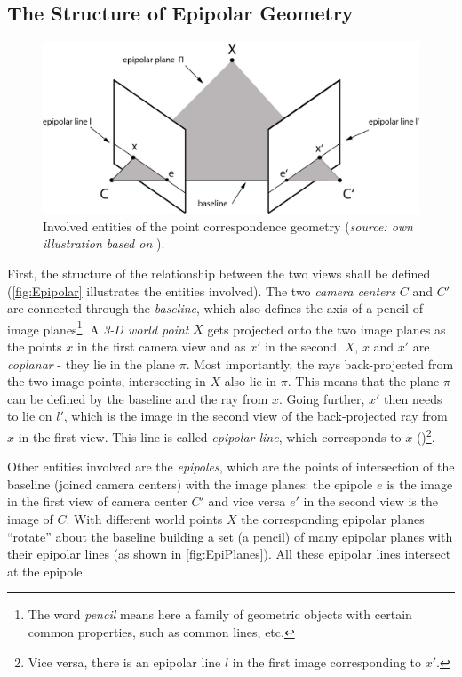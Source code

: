 \subsection{The Structure of Epipolar Geometry}
\begin{figure}[htbp]
		\centering
		\includegraphics[width=1.0\textwidth]{figures/EpipolarGeometry}
		\caption[Involved entities of the point correspondence geometry]{Involved entities of the point correspondence geometry (\textit{source: own illustration based on} \cite[p.240]{Hartley.2011}).}
		\label{fig:Epipolar}
\end{figure}

First, the structure of the relationship between the two views shall be defined (\autoref{fig:Epipolar} illustrates the entities involved). The two \textit{camera centers} $C$ and $C'$ are connected through the \textit{baseline}, which also defines the axis of a pencil of image planes\footnote{The word \textit{pencil} means here a family of geometric objects with certain common properties, such as common lines, etc.}. A \textit{3-D world point} $X$ gets projected onto the two image planes as the points $x$ in the first camera view and as $x'$ in the second.  $X$, $x$ and $x'$ are \textit{coplanar} - they lie in the plane $\pi$. Most importantly, the rays back-projected from the two image points, intersecting in $X$ also lie in $\pi$. This means that the plane $\pi$ can be defined by the baseline and the ray from $x$. Going further, $x'$ then needs to lie on $l'$, which is the image in the second view of the back-projected ray from $x$ in the first view. This line is called \textit{epipolar line}, which corresponds to $x$ (\cite[p.239 et seq.]{Hartley.2011})\footnote{Vice versa, there is an epipolar line $l$ in the first image corresponding to $x'$.}.

Other entities involved are the \textit{epipoles}, which are the points of intersection of the baseline (joined camera centers) with the image planes: the epipole $e$ is the image in the first view of camera center $C'$ and vice versa $e'$ in the second view is the image of $C$. With different world points $X$ the corresponding epipolar planes \enquote{rotate} about the baseline building a set (a pencil) of many epipolar planes with their epipolar lines (as shown in \autoref{fig:EpiPlanes}). All these epipolar lines intersect at the epipole.

